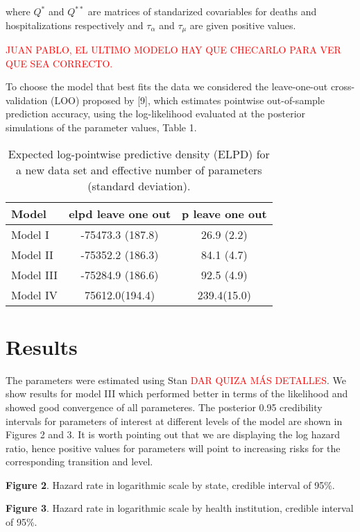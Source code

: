 \documentclass[10pt,letterpaper]{article}
\begin{document}
where \(Q^*\) and \(Q^{**}\) are matrices of standarized covariables for
deaths and hospitalizations respectively and \(\tau_\alpha\) and
\(\tau_{\mu}\) are given positive values.

\textcolor{red}{JUAN PABLO, EL ULTIMO MODELO HAY QUE CHECARLO PARA VER QUE SEA CORRECTO.}

To choose the model that best fits the data we considered the
leave-one-out cross-validation (LOO) proposed by {[}9{]}, which
estimates pointwise out-of-sample prediction accuracy, using the
log-likelihood evaluated at the posterior simulations of the parameter
values, Table 1.

\begin{table}[!htb]
\centering
\begin{tabular}{lcc}
\hline
{\textbf{Model}} & {\textbf{elpd leave one out}} & {\textbf{p leave one out}} \\
\hline Model I  &  -75473.3 (187.8) & 26.9 (2.2) \\
Model II          &   -75352.2 (186.3) &  84.1 (4.7)\\
Model III         &    -75284.9 (186.6) &  92.5 (4.9)  \\
Model IV & 75612.0(194.4) & 239.4(15.0) \\
\hline
\end{tabular}
\caption{\label{tab:gof} Expected log-pointwise predictive density (ELPD) for a new data set and effective number of parameters (standard deviation).}
\end{table}

\section{Results}\label{results}

The parameters were estimated using Stan
\textcolor{red}{DAR QUIZA MÁS DETALLES}. We show results for model III
which performed better in terms of the likelihood and showed good
convergence of all parameteres. The posterior 0.95 credibility intervals
for parameters of interest at different levels of the model are shown in
Figures 2 and 3. It is worth pointing out that we are displaying the log
hazard ratio, hence positive values for parameters will point to
increasing risks for the corresponding transition and level.

\textbf{Figure 2}. Hazard rate in logarithmic scale by state, credible
interval of 95\%.

\textbf{Figure 3}. Hazard rate in logarithmic scale by health
institution, credible interval of 95\%.
\end{document}
